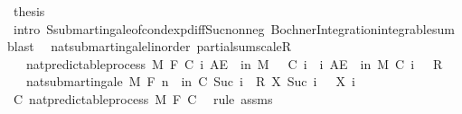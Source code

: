 \begin{isabellebody}
\ {\isacharquery}{\kern0pt}thesis\ \isamarkupfalse%
\ {\isacharparenleft}{\kern0pt}intro\ S{\isachardot}{\kern0pt}submartingale{\isacharunderscore}{\kern0pt}of{\isacharunderscore}{\kern0pt}cond{\isacharunderscore}{\kern0pt}exp{\isacharunderscore}{\kern0pt}diff{\isacharunderscore}{\kern0pt}Suc{\isacharunderscore}{\kern0pt}nonneg\ Bochner{\isacharunderscore}{\kern0pt}Integration{\isachardot}{\kern0pt}integrable{\isacharunderscore}{\kern0pt}sum{\isacharcomma}{\kern0pt}\ blast{\isacharplus}{\kern0pt}{\isacharparenright}{\kern0pt}\isanewline
{}\isamarkupfalse%
%
\endisatagproof
{\isafoldproof}%
%
\isadelimproof
\isanewline
%
\endisadelimproof
\isanewline
{}\isamarkupfalse%
\ {\isacharparenleft}{\kern0pt}\ nat{\isacharunderscore}{\kern0pt}submartingale{\isacharunderscore}{\kern0pt}linorder{\isacharparenright}{\kern0pt}\ partial{\isacharunderscore}{\kern0pt}sum{\isacharunderscore}{\kern0pt}scaleR{\isacharprime}{\kern0pt}{\isacharcolon}{\kern0pt}\isanewline
\ \ \ {\isachardoublequoteopen}nat{\isacharunderscore}{\kern0pt}predictable{\isacharunderscore}{\kern0pt}process\ M\ F\ C{\isachardoublequoteclose}\ {\isachardoublequoteopen}{\isasymAnd}i{\isachardot}{\kern0pt}\ AE\ {\isasymxi}\ in\ M{\isachardot}{\kern0pt}\ {}\ {\isasymle}\ C\ i\ {\isasymxi}{\isachardoublequoteclose}\ {\isachardoublequoteopen}{\isasymAnd}i{\isachardot}{\kern0pt}\ AE\ {\isasymxi}\ in\ M{\isachardot}{\kern0pt}\ C\ i\ {\isasymxi}\ {\isasymle}\ R{\isachardoublequoteclose}\isanewline
\ \ \ {\isachardoublequoteopen}nat{\isacharunderscore}{\kern0pt}submartingale\ M\ F\ {\isacharparenleft}{\kern0pt}{\isasymlambda}n\ {\isasymxi}{\isachardot}{\kern0pt}\ {\isasymSum}i{\isacharless}{\kern0pt}n{\isachardot}{\kern0pt}\ C\ {\isacharparenleft}{\kern0pt}Suc\ i{\isacharparenright}{\kern0pt}\ {\isasymxi}\ {\isacharasterisk}{\kern0pt}\isactrlsub R\ {\isacharparenleft}{\kern0pt}X\ {\isacharparenleft}{\kern0pt}Suc\ i{\isacharparenright}{\kern0pt}\ {\isasymxi}\ {\isacharminus}{\kern0pt}\ X\ i\ {\isasymxi}{\isacharparenright}{\kern0pt}{\isacharparenright}{\kern0pt}{\isachardoublequoteclose}\isanewline
%
\isadelimproof
%
\endisadelimproof
%
\isatagproof
{}\isamarkupfalse%
\ {\isacharminus}{\kern0pt}\isanewline
\ \ \isamarkupfalse%
\ C{\isacharcolon}{\kern0pt}\ nat{\isacharunderscore}{\kern0pt}predictable{\isacharunderscore}{\kern0pt}process\ M\ F\ C\ \isamarkupfalse%
\ {\isacharparenleft}{\kern0pt}rule\ assms{\isacharparenright}{\kern0pt}\isanewline
\ \ \isamarkupfalse%

\end{isabellebody}
